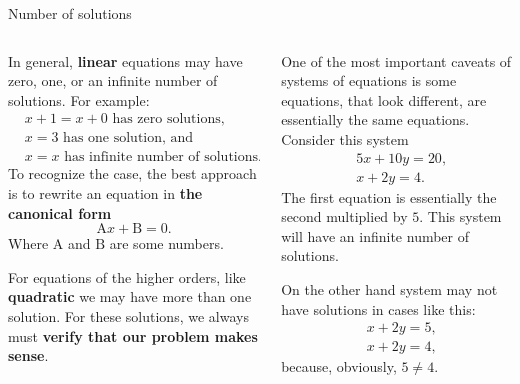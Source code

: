 \documentclass[9pt,aspectratio=169]{beamer}
\begin{document}
\begin{frame}{Number of solutions}
  \begin{columns}[T]
    \begin{column}{0.5\textwidth}
      In general, \textbf{linear} equations may have zero, one, or an infinite number of solutions. For example:
      \begin{align*}
        &x + 1 = x + 0 \text{ has zero solutions, }\\
        &x = 3 \text{ has one solution, and }\\
        &x = x \text{ has infinite number of solutions.}
      \end{align*}
      To recognize the case, the best approach is to rewrite an equation in \textbf{the canonical form}
      \[ \text{A} x + \text{B} = 0. \]
      Where $\text{A}$ and $\text{B}$ are some numbers.

      For equations of the higher orders, like \textbf{quadratic} we may have more than one solution. For these solutions, we always must \textbf{verify that our problem makes sense}.
    \end{column}
    \begin{column}{0.5\textwidth}
      One of the most important caveats of systems of equations is some equations, that look different, are essentially the same equations. Consider this system
      \begin{align*}
        &5x + 10y = 20,\\
        &x + 2y = 4.
      \end{align*}
      The first equation is essentially the second multiplied by $5$. This system will have an infinite number of solutions.

      On the other hand system may not have solutions in cases like this:
      \begin{align*}
        &x + 2y = 5,\\
        &x + 2y = 4,
      \end{align*}
      because, obviously, $5 \neq 4$.
    \end{column}
  \end{columns}
\end{frame}
\end{document}
